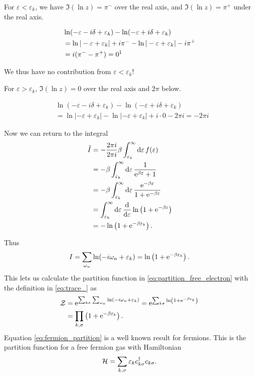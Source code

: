 For $\varepsilon < \varepsilon_k$, we have \(\Im(\ln z) = \pi^-\) over the real axis, and \(\Im(\ln z) = \pi^+\) under the real axis. 

\begin{align}
&\ln (-\varepsilon -i\delta + \varepsilon_k) - \ln(-\varepsilon + i\delta+\varepsilon_k) \nonumber \\
&=\ln|-\varepsilon + \varepsilon_k| + i\pi^- - \ln|-\varepsilon + \varepsilon_k| - i\pi^+\nonumber \\
&= i(\pi^- - \pi^+) = 0 \text{\footnotemark}
\end{align}

We thus have no contribution from $\varepsilon <\varepsilon_k$!

For $\varepsilon>\varepsilon_k$, $\Im(\ln z) = 0$ over the real axis and $2\pi$ below. 

\begin{align}
&\ln (-\varepsilon -i\delta + \varepsilon_k) - \ln(-\varepsilon + i\delta+\varepsilon_k) \nonumber \\
&= \ln|-\varepsilon+ \varepsilon_k| - \ln|-\varepsilon + \varepsilon_k| + i\cdot 0 - 2\pi i = -2\pi i
\end{align}

Now we can return to the integral
\begin{align}
\tilde{I} &= -\frac{2\pi i}{2\pi i}\beta\int_{\varepsilon_k}^\infty\dd{\varepsilon}f(\varepsilon) \\
&= -\beta\int_{\varepsilon_k}^\infty\dd{\varepsilon}\frac{1}{\mathrm{e}^{\beta\varepsilon}+1} \\
&= -\beta\int_{\varepsilon_k}^\infty \dd{\varepsilon}\frac{\mathrm{e}^{-\beta\varepsilon}}{1+\mathrm{e}^{-\beta\varepsilon}} \\
&= \int_{\varepsilon_k}^\infty \dd{\varepsilon} \dv{\varepsilon}\ln\left( 1+\mathrm{e}^{-\beta\varepsilon}\right)\\
&= -\ln\left(1+\mathrm{e}^{-\beta\varepsilon_k}\right).
\end{align}

Thus
\begin{equation}
I = \sum_{\omega_n}\ln(-i\omega_n+\varepsilon_k) = \ln\left(1+\mathrm{e}^{-\beta\varepsilon_k}\right).
\end{equation}
This lets us calculate the partition function in \eqref{eq:partition_free_electron} with the definition in \eqref{eq:trace_} as
\begin{align}
\mathcal{Z} &= \mathrm{e}^{\sum_{k\sigma}\sum_{\omega_n}\ln(-i\omega_n+\varepsilon_k)} = \mathrm{e}^{\sum_{k\sigma}\ln\left(1+\mathrm{e}^{-\beta\varepsilon_k}\right)}\nonumber \\
&= \prod_{k,\sigma}\left(1+\mathrm{e}^{-\beta\varepsilon_k}\right).\label{eq:fermion_partition}
\end{align}
Equation \eqref{eq:fermion_partition} is a well known result for fermions. This is the partition function for a free fermion gas with Hamiltonian 
\begin{equation}
\mathcal{H} = \sum_{k,\sigma}\varepsilon_kc_{k\sigma}^\dagger c_{k\sigma}.
\end{equation}